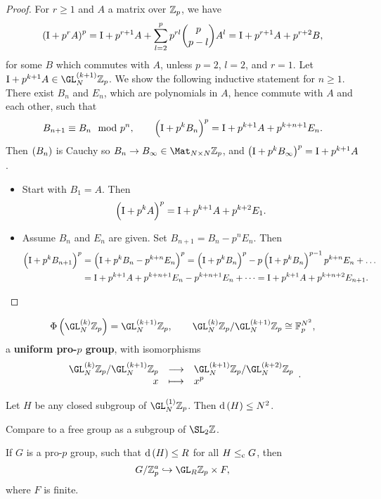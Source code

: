 \begin{proof}
For $ r \ge 1 $ and $ A $ a matrix over $ \mathbb{Z}_p $, we have
$$ \br{\I + p^rA}^p = \I + p^{r + 1}A + \sum_{l = 2}^p p^{rl}\binom{p}{p - l}A^l = \I + p^{r + 1}A + p^{r + 2}B, $$
for some $ B $ which commutes with $ A $, unless $ p = 2 $, $ l = 2 $, and $ r = 1 $. Let $ \I + p^{k + 1}A \in \GL_N^{\br{k + 1}} \ZZ_p $. We show the following inductive statement for $ n \ge 1 $. There exist $ B_n $ and $ E_n $, which are polynomials in $ A $, hence commute with $ A $ and each other, such that
$$ B_{n + 1} \equiv B_n \mod p^n, \qquad \br{\I + p^kB_n}^p = \I + p^{k + 1}A + p^{k + n + 1}E_n. $$
Then $ \br{B_n} $ is Cauchy so $ B_n \to B_\infty \in \Mat_{N \times N} \ZZ_p $, and $ \br{\I + p^kB_\infty}^p = \I + p^{k + 1}A $.
\begin{itemize}
\item Start with $ B_1 = A $. Then
$$ \br{\I + p^kA}^p = \I + p^{k + 1}A + p^{k + 2}E_1. $$
\item Assume $ B_n $ and $ E_n $ are given. Set $ B_{n + 1} = B_n - p^nE_n $. Then
\begin{align*}
\br{\I + p^kB_{n + 1}}^p
& = \br{\I + p^kB_n - p^{k + n}E_n}^p
= \br{\I + p^kB_n}^p - p\br{\I + p^kB_n}^{p - 1}p^{k + n}E_n + \dots \\
& = \I + p^{k + 1}A + p^{k + n + 1}E_n - p^{k + n + 1}E_n + \dots
= \I + p^{k + 1}A + p^{k + n + 2}E_{n + 1}.
\end{align*}
\end{itemize}
\end{proof}

\begin{proposition}
$$ \Phi\br{\GL_N^{\br{k}} \ZZ_p} = \GL_N^{\br{k + 1}} \ZZ_p, \qquad \GL_N^{\br{k}} \ZZ_p / \GL_N^{\br{k + 1}} \ZZ_p \cong \FF_p^{N^2}, $$
a \textbf{uniform pro-$ p $ group}, with isomorphisms
$$ \function{\GL_N^{\br{k}} \ZZ_p / \GL_N^{\br{k + 1}} \ZZ_p}{\GL_N^{\br{k + 1}} \ZZ_p / \GL_N^{\br{k + 2}} \ZZ_p}{x}{x^p}. $$
\end{proposition}

\begin{theorem}
Let $ H $ be any closed subgroup of $ \GL_N^{\br{1}} \ZZ_p $. Then $ \d\br{H} \le N^2 $.
\end{theorem}

Compare to a free group as a subgroup of $ \SL_2 \ZZ $.

\begin{theorem}
If $ G $ is a pro-$ p $ group, such that $ \d\br{H} \le R $ for all $ H \le_{\mathrm{c}} G $, then
$$ G / \ZZ_p^a \hookrightarrow \GL_R \ZZ_p \times F, $$
where $ F $ is finite.
\end{theorem}

